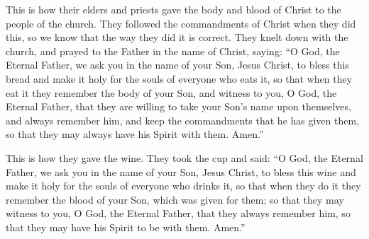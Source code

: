 \bchapter
\bverse \iffalse The manner of their elders and priests administering the flesh and blood of Christ unto the church; and they administered it according to the commandments of Christ; wherefore we know the manner to be true; and the elder or priest did minister it-- \fi
This is how their elders and priests gave the body and blood of Christ to the people of the church. They followed the commandments of Christ when they did this, so we know that the way they did it is correct.
\bverse \iffalse And they did kneel down with the church, and pray to the Father in the name of Christ, saying: \fi
They knelt down with the church, and prayed to the Father in the name of Christ, saying:
\bverse \iffalse O God, the Eternal Father, we ask thee in the name of thy Son, Jesus Christ, to bless and sanctify this bread to the souls of all those who partake of it; that they may eat in remembrance of the body of thy Son, and witness unto thee, O God, the Eternal Father, that they are willing to take upon them the name of thy Son, and always remember him, and keep his commandments which he hath given them, that they may always have his Spirit to be with them. Amen. \fi
``O God, the Eternal Father, we ask you in the name of your Son, Jesus Christ, to bless this bread and make it holy for the souls of everyone who eats it, so that when they eat it they remember the body of your Son, and witness to you, O God, the Eternal Father, that they are willing to take your Son's name upon themselves, and always remember him, and keep the commandments that he has given them, so that they may always have his Spirit with them. Amen.''

\bchapter
\bverse \iffalse The manner of administering the wine--Behold, they took the cup, and said: \fi
This is how they gave the wine. They took the cup and said:
\bverse \iffalse O God, the Eternal Father, we ask thee, in the name of thy Son, Jesus Christ, to bless and sanctify this wine to the souls of all those who drink of it, that they may do it in remembrance of the blood of thy Son, which was shed for them; that they may witness unto thee, O God, the Eternal Father, that they do always remember him, that they may have his Spirit to be with them.  Amen. \fi
``O God, the Eternal Father, we ask you in the name of your Son, Jesus Christ, to bless this wine and make it holy for the souls of everyone who drinks it, so that when they do it they remember the blood of your Son, which was given for them; so that they may witness to you, O God, the Eternal Father, that they always remember him, so that they may have his Spirit to be with them. Amen.''

